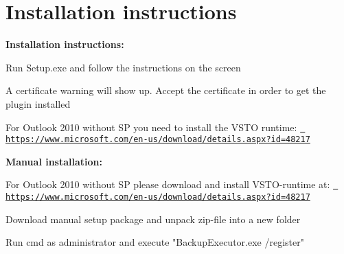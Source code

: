 \chapter{Installation instructions}
\hypertarget{md__c_1_2_users_2gg_2_documents_2_d_a_d_o_s_2_i_t_e_c-_p_r_o_j_e_c_t_s_2outlookbackupaddin_2docs_2_installation_01instructions}{}\label{md__c_1_2_users_2gg_2_documents_2_d_a_d_o_s_2_i_t_e_c-_p_r_o_j_e_c_t_s_2outlookbackupaddin_2docs_2_installation_01instructions}
{\bfseries{Installation instructions\+:}}


\begin{DoxyItemize}
\item Run Setup.\+exe and follow the instructions on the screen
\item A certificate warning will show up. Accept the certificate in order to get the plugin installed
\item For Outlook 2010 without SP you need to install the VSTO runtime\+: \href{https://www.microsoft.com/en-us/download/details.aspx?id=48217}{\texttt{ https\+://www.\+microsoft.\+com/en-\/us/download/details.\+aspx?id=48217}}
\end{DoxyItemize}

{\bfseries{Manual installation\+:}}


\begin{DoxyItemize}
\item For Outlook 2010 without SP please download and install VSTO-\/runtime at\+: \href{https://www.microsoft.com/en-us/download/details.aspx?id=48217}{\texttt{ https\+://www.\+microsoft.\+com/en-\/us/download/details.\+aspx?id=48217}}
\item Download manual setup package and unpack zip-\/file into a new folder
\item Run cmd as administrator and execute "{}\+Backup\+Executor.\+exe /register"{} 
\end{DoxyItemize}